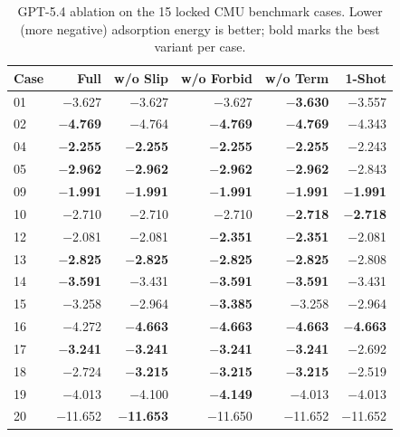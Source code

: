\documentclass[%
 preprint,
 superscriptaddress,
 amsmath,amssymb,
 aps,
 prb,
 floatfix,
]{revtex4-2}
\begin{document}
\begin{table}[ht]
\centering
\small
\caption{GPT-5.4 ablation on the 15 locked CMU benchmark cases. Lower (more negative) adsorption energy is better; bold marks the best variant per case.}
\label{tab:si-ablation-gpt54}
\begin{tabular}{lrrrrr}
\toprule
Case & Full & w/o Slip & w/o Forbid & w/o Term & 1-Shot \\
\midrule
01 & $-$3.627 & $-$3.627 & $-$3.627 & \textbf{$-$3.630} & $-$3.557 \\
02 & \textbf{$-$4.769} & $-$4.764 & \textbf{$-$4.769} & \textbf{$-$4.769} & $-$4.343 \\
04 & \textbf{$-$2.255} & \textbf{$-$2.255} & \textbf{$-$2.255} & \textbf{$-$2.255} & $-$2.243 \\
05 & \textbf{$-$2.962} & \textbf{$-$2.962} & \textbf{$-$2.962} & \textbf{$-$2.962} & $-$2.843 \\
09 & \textbf{$-$1.991} & \textbf{$-$1.991} & \textbf{$-$1.991} & \textbf{$-$1.991} & \textbf{$-$1.991} \\
10 & $-$2.710 & $-$2.710 & $-$2.710 & \textbf{$-$2.718} & \textbf{$-$2.718} \\
12 & $-$2.081 & $-$2.081 & \textbf{$-$2.351} & \textbf{$-$2.351} & $-$2.081 \\
13 & \textbf{$-$2.825} & \textbf{$-$2.825} & \textbf{$-$2.825} & \textbf{$-$2.825} & $-$2.808 \\
14 & \textbf{$-$3.591} & $-$3.431 & \textbf{$-$3.591} & \textbf{$-$3.591} & $-$3.431 \\
15 & $-$3.258 & $-$2.964 & \textbf{$-$3.385} & $-$3.258 & $-$2.964 \\
16 & $-$4.272 & \textbf{$-$4.663} & \textbf{$-$4.663} & \textbf{$-$4.663} & \textbf{$-$4.663} \\
17 & \textbf{$-$3.241} & \textbf{$-$3.241} & \textbf{$-$3.241} & \textbf{$-$3.241} & $-$2.692 \\
18 & $-$2.724 & \textbf{$-$3.215} & \textbf{$-$3.215} & \textbf{$-$3.215} & $-$2.519 \\
19 & $-$4.013 & $-$4.100 & \textbf{$-$4.149} & $-$4.013 & $-$4.013 \\
20 & $-$11.652 & \textbf{$-$11.653} & $-$11.650 & $-$11.652 & $-$11.652 \\
\bottomrule
\end{tabular}
\end{table}
\end{document}
